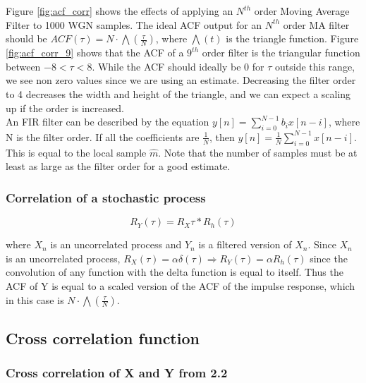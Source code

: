 \documentclass{article}
\begin{document}
Figure \ref{fig:acf_corr} shows the effects of applying an $N^{th}$ order Moving Average Filter to 1000 WGN samples. The ideal ACF output for an $N^{th}$ order MA filter should be $ACF(\tau) = N \cdot \bigwedge(\frac{\tau}{N})$, where $\bigwedge(t)$ is the triangle function. Figure \ref{fig:acf_corr_9} shows that the ACF of a $9^{th}$ order filter is the triangular function between $-8<\tau<8$. While the ACF should ideally be 0 for $\tau$ outside this range, we see non zero values since we are using an estimate. Decreasing the filter order to 4 decreases the width and height of the triangle, and we can expect a scaling up if the order is increased.\\

An FIR filter can be described by the equation $y[n]=\sum_{i=0}^{N-1}b_ix[n-i]$, where N is the filter order. If all the coefficients are $\frac{1}{N}$, then $y[n]=\frac{1}{N} \sum_{i=0}^{N-1}x[n-i]$. This is equal to the local sample $\hat{m}$. Note that the number of samples must be at least as large as the filter order for a good estimate.

\subsubsection{Correlation of a stochastic process}

\begin{equation}
R_Y(\tau)=R_X{\tau} \ast R_h(\tau)
\end{equation}

where $X_n$ is an uncorrelated process and $Y_n$ is a filtered version of $X_n$. Since $X_n$ is an uncorrelated process, $R_X(\tau)=\alpha \delta(\tau) \Rightarrow R_Y(\tau)=\alpha R_h(\tau)$ since the convolution of any function with the delta function is equal to itself. Thus the ACF of Y is equal to a scaled version of the ACF of the impulse response, which in this case is $N \cdot \bigwedge(\frac{\tau}{N})$.

\vspace{0.5cm}

\subsection{Cross correlation function}

\subsubsection{Cross correlation of X and Y from 2.2}
\end{document}
